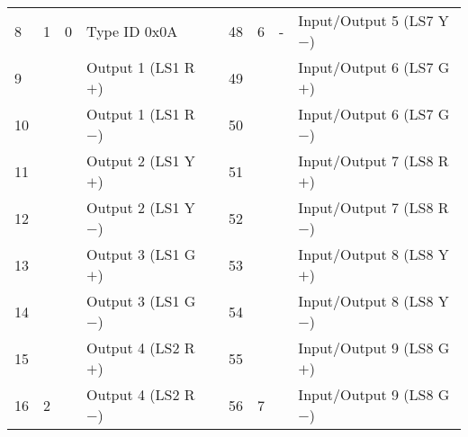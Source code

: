 \documentclass[]{article}
\begin{document}
\begin{landscape}
\begin{table}[ht]
\begin{tabular}{lllllllll}
			8            & \multirow{-8}{*}{1} & 0                  & \multirow{-8}{*}{Type ID 0x0A} & \multirow{-9}{*}{} & 48                       & \multirow{-8}{*}{6}                        & \multirow{-8}{*}{-}                        & Input/Output 5 (LS7 Y$-$)              \\ \cline{1-4} \cline{6-9} 
			9            &                     &                    & Output 1 (LS1 R$+$)            &                    & 49                       &                                            &                                            & Input/Output 6 (LS7 G$+$)              \\
			10           &                     &                    & Output 1 (LS1 R$-$)            &                    & 50                       &                                            &                                            & Input/Output 6 (LS7 G$-$)              \\
			11           &                     &                    & Output 2 (LS1 Y$+$)            &                    & 51                       &                                            &                                            & Input/Output 7 (LS8 R$+$)              \\
			12           &                     &                    & Output 2 (LS1 Y$-$)            &                    & 52                       &                                            &                                            & Input/Output 7 (LS8 R$-$)              \\
			13           &                     &                    & Output 3 (LS1 G$+$)            &                    & 53                       &                                            &                                            & Input/Output 8 (LS8 Y$+$)              \\
			14           &                     &                    & Output 3 (LS1 G$-$)            &                    & 54                       &                                            &                                            & Input/Output 8 (LS8 Y$-$)              \\
			15           &                     &                    & Output 4 (LS2 R$+$)            &                    & 55                       &                                            &                                            & Input/Output 9 (LS8 G$+$)              \\
			16           & \multirow{-8}{*}{2} & \multirow{-8}{*}{} & Output 4 (LS2 R$-$)            &                    & 56                       & \multirow{-8}{*}{7}                        & \multirow{-8}{*}{}                         & Input/Output 9 (LS8 G$-$)              \\ \cline{1-4} \cline{6-9} 

\end{tabular}
\end{table}
\end{landscape}
\end{document}
